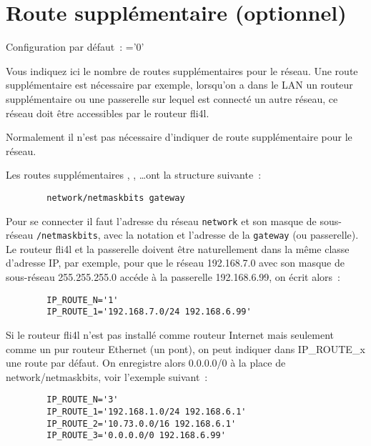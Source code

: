 
\section{Route supplémentaire (optionnel)}

\begin{description}

    Configuration par défaut~: ='0'

    {Vous indiquez ici le nombre de routes supplémentaires pour le réseau. Une
    route supplémentaire est nécessaire par exemple, lorsqu'on a dans le
    LAN un routeur supplémentaire ou une passerelle sur lequel est connecté un
    autre réseau, ce réseau doit être accessibles par le routeur fli4l.

    Normalement il n'est pas nécessaire d'indiquer de route supplémentaire
    pour le réseau.
    }


    {Les routes supplémentaires , ,
    \ldots ont la structure suivante~:

\begin{example}
\begin{verbatim}
        network/netmaskbits gateway
\end{verbatim}
\end{example}

    Pour se connecter il faut l'adresse du réseau \texttt{network} et son masque de
    sous-réseau \texttt{/netmaskbits}, avec la notation  et
    l'adresse de la \texttt{gateway} (ou passerelle). Le routeur fli4l et la passerelle
    doivent être naturellement dans la même classe d'adresse IP, par exemple,
    pour que le réseau 192.168.7.0 avec son masque de sous-réseau 255.255.255.0
    accéde à la passerelle 192.168.6.99, on écrit alors~:

\begin{example}
\begin{verbatim}
        IP_ROUTE_N='1'
        IP_ROUTE_1='192.168.7.0/24 192.168.6.99'
\end{verbatim}
\end{example}}

    Si le routeur fli4l n'est pas installé comme routeur Internet mais
    seulement comme un pur routeur Ethernet (un pont), on peut indiquer dans
    IP\_ROUTE\_x une route par défaut. On enregistre alors 0.0.0.0/0 à la place
    de network/netmaskbits, voir l'exemple suivant~:

\begin{example}
\begin{verbatim}
        IP_ROUTE_N='3'
        IP_ROUTE_1='192.168.1.0/24 192.168.6.1'
        IP_ROUTE_2='10.73.0.0/16 192.168.6.1'
        IP_ROUTE_3='0.0.0.0/0 192.168.6.99'
\end{verbatim}
\end{example}
\end{description}

